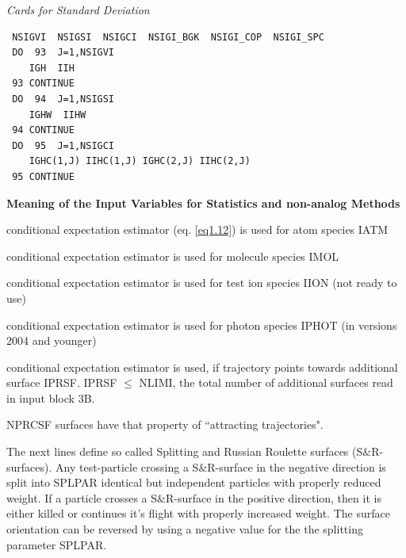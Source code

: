  {\sl * Cards for Standard Deviation}

\begin{verbatim}
 NSIGVI  NSIGSI  NSIGCI  NSIGI_BGK  NSIGI_COP  NSIGI_SPC
 DO  93  J=1,NSIGVI
    IGH  IIH
 93 CONTINUE
 DO  94  J=1,NSIGSI
    IGHW  IIHW
 94 CONTINUE
 DO  95  J=1,NSIGCI
    IGHC(1,J) IIHC(1,J) IGHC(2,J) IIHC(2,J)
 95 CONTINUE
\end{verbatim}

\medskip

\noindent

{\bf Meaning of the Input Variables for Statistics and non-analog
Methods}

\medskip

\noindent

\begin{list}{ }{}
\item[{\bf NLPRCA }] conditional expectation estimator (eq.
\ref{eq1.12}) is used for atom species IATM
\item[{\bf NLPRCM }]
conditional expectation estimator is used for molecule species
IMOL
\item[{\bf NLPRCI }] conditional expectation estimator is
used for test ion species IION (not ready to use)
\item[{\bf NLPRCPH }] conditional expectation estimator is
used for photon species IPHOT (in versions 2004 and younger)
\item[{\bf IPRSF
}] conditional expectation estimator is used, if trajectory points
towards additional surface IPRSF. IPRSF $\leq$ NLIMI, the total number of additional
surfaces read in input block 3B.

NPRCSF surfaces have that property of ``attracting trajectories".
\end{list}
The next lines define so called Splitting and Russian Roulette
surfaces (S$\&$R-surfaces). Any test-particle crossing a
S$\&$R-surface in the negative direction is split into SPLPAR
identical but independent particles with properly reduced weight.
If a particle crosses a S$\&$R-surface in the positive direction,
then it is either killed or continues it's flight with properly
increased weight. The surface orientation can be reversed by using
a negative value for the the splitting parameter SPLPAR.
